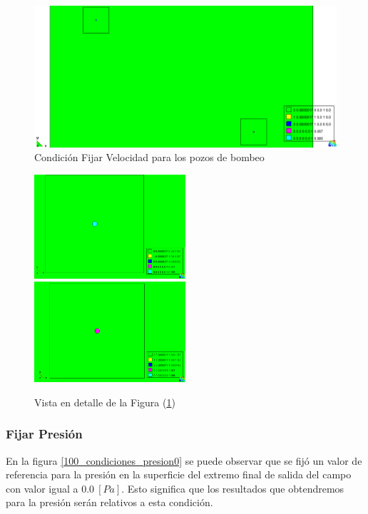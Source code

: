 \documentclass[10pt,a4paper,final]{article}
\begin{document}
\begin{figure}[tbhp]
\centerline{\includegraphics[scale=0.4]{img/100m/100_condiciones_fijar_velocidad_fondo_pozos}}
\caption{Condición Fijar Velocidad para los pozos de bombeo}
\label{100_condiciones_fijar_velocidad_fondo_pozos}
\end{figure}
\begin{figure}[htbp] 
\centering 
\includegraphics[width=0.5\textwidth]{img/100m/100_condiciones_fijar_velocidad_fondo_pozos_arriba_izquierda} 
\includegraphics[width=0.5\textwidth]{img/100m/100_condiciones_fijar_velocidad_fondo_pozos_abajo_derecha}
\caption{Vista en detalle de la Figura (\ref{100_condiciones_fijar_velocidad_fondo_pozos})} 
\label{fondo_pozos_detalles} 
\end{figure} 
\subsubsection*{Fijar Presión}
En la figura \ref{100_condiciones_presion0} se puede observar que se fijó un valor de referencia para la presión en la superficie del extremo final de salida del campo con valor igual a $0.0~\left[Pa\right]$. Esto significa que los resultados que obtendremos para la presión serán relativos a esta condición.
\end{document}
